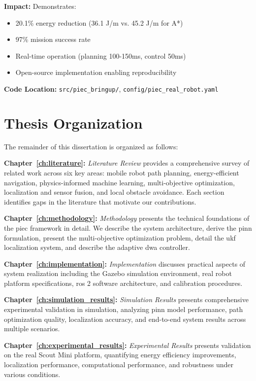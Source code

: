 \textbf{Impact:} Demonstrates:
\begin{itemize}
    \item 20.1\% energy reduction (36.1 J/m vs. 45.2 J/m for A*)
    \item 97\% mission success rate
    \item Real-time operation (planning 100-150ms, control 50ms)
    \item Open-source implementation enabling reproducibility
\end{itemize}

\textbf{Code Location:} \texttt{src/piec\_bringup/}, \texttt{config/piec\_real\_robot.yaml}

\section{Thesis Organization}
\label{sec:organization}

The remainder of this dissertation is organized as follows:

\textbf{Chapter~\ref{ch:literature}:} \textit{Literature Review} provides a comprehensive survey of related work across six key areas: mobile robot path planning, energy-efficient navigation, physics-informed machine learning, multi-objective optimization, localization and sensor fusion, and local obstacle avoidance. Each section identifies gaps in the literature that motivate our contributions.

\textbf{Chapter~\ref{ch:methodology}:} \textit{Methodology} presents the technical foundations of the \acrshort{piec} framework in detail. We describe the system architecture, derive the \acrshort{pinn} formulation, present the multi-objective optimization problem, detail the \acrshort{ukf} localization system, and describe the adaptive \acrshort{dwa} controller.

\textbf{Chapter~\ref{ch:implementation}:} \textit{Implementation} discusses practical aspects of system realization including the Gazebo simulation environment, real robot platform specifications, \acrshort{ros} 2 software architecture, and calibration procedures.

\textbf{Chapter~\ref{ch:simulation_results}:} \textit{Simulation Results} presents comprehensive experimental validation in simulation, analyzing \acrshort{pinn} model performance, path optimization quality, localization accuracy, and end-to-end system results across multiple scenarios.

\textbf{Chapter~\ref{ch:experimental_results}:} \textit{Experimental Results} presents validation on the real Scout Mini platform, quantifying energy efficiency improvements, localization performance, computational performance, and robustness under various conditions.

